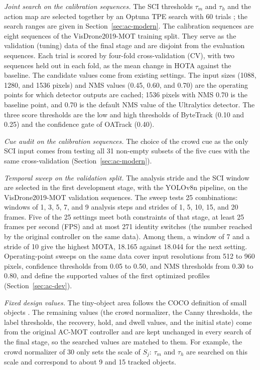 \emph{Joint search on the calibration sequences.} The SCI thresholds $\tau_m$ and $\tau_h$ and the action map are selected together by an Optuna TPE search with 60 trials \cite{akiba2019optuna}; the search ranges are given in Section~\ref{sec:ac-modern}. The calibration sequences are eight sequences of the VisDrone2019-MOT training split. They serve as the validation (tuning) data of the final stage and are disjoint from the evaluation sequences. Each trial is scored by four-fold cross-validation (CV), with two sequences held out in each fold, as the mean change in HOTA against the baseline. The candidate values come from existing settings. The input sizes (1088, 1280, and 1536 pixels) and NMS values (0.45, 0.60, and 0.70) are the operating points for which detector outputs are cached; 1536 pixels with NMS 0.70 is the baseline point, and 0.70 is the default NMS value of the Ultralytics detector. The three score thresholds are the low and high thresholds of ByteTrack (0.10 and 0.25) and the confidence gate of OATrack (0.40).

\emph{Cue audit on the calibration sequences.} The choice of the crowd cue as the only SCI input comes from testing all 31 non-empty subsets of the five cues with the same cross-validation (Section~\ref{sec:ac-modern}).

\emph{Temporal sweep on the validation split.} The analysis stride and the SCI window are selected in the first development stage, with the YOLOv8n pipeline, on the VisDrone2019-MOT validation sequences. The sweep tests 25 combinations: windows of 1, 3, 5, 7, and 9 analysis steps and strides of 1, 5, 10, 15, and 20 frames. Five of the 25 settings meet both constraints of that stage, at least 25 frames per second (FPS) and at most 271 identity switches (the number reached by the original controller on the same data). Among them, a window of 7 and a stride of 10 give the highest MOTA, 18.165 against 18.044 for the next setting. Operating-point sweeps on the same data cover input resolutions from 512 to 960 pixels, confidence thresholds from 0.05 to 0.50, and NMS thresholds from 0.30 to 0.80, and define the supported values of the first optimized profiles (Section~\ref{sec:ac-dev}).

\emph{Fixed design values.} The tiny-object area follows the COCO definition of small objects \cite{lin2014coco}. The remaining values (the crowd normalizer, the Canny thresholds, the label thresholds, the recovery, hold, and dwell values, and the initial state) come from the original AC-MOT controller and are kept unchanged in every search of the final stage, so the searched values are matched to them. For example, the crowd normalizer of 30 only sets the scale of $S_j$: $\tau_m$ and $\tau_h$ are searched on this scale and correspond to about 9 and 15 tracked objects.

